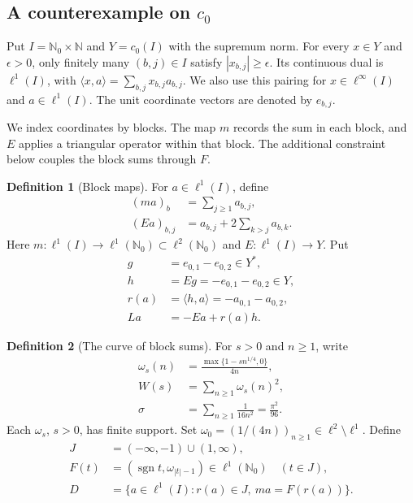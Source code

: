 \documentclass[11pt]{article}
\newcommand{\N}{\mathbb N}
\newcommand{\Nzero}{\mathbb N_0}
\newcommand{\sgn}{\operatorname{sgn}}
\newcommand{\pair}[2]{\langle #1,#2\rangle}
\theoremstyle{definition}
\newtheorem{definition}{Definition}
\theoremstyle{remark}
\begin{document}
\subsection{A counterexample on $c_0$}

Put $I=\Nzero\times\N$ and $Y=c_0(I)$ with the supremum norm. For every $x\in Y$ and $\epsilon>0$, only finitely many $(b,j)\in I$ satisfy $|x_{b,j}|\ge\epsilon$. Its continuous dual is $\ell^1(I)$, with $\pair{x}{a}=\sum_{b,j}x_{b,j}a_{b,j}$. We also use this pairing for $x\in\ell^\infty(I)$ and $a\in\ell^1(I)$. The unit coordinate vectors are denoted by $e_{b,j}$.

We index coordinates by blocks. The map $m$ records the sum in each block, and $E$ applies a triangular operator within that block. The additional constraint below couples the block sums through $F$.
\begin{definition}[Block maps]
For $a\in\ell^1(I)$, define
\begin{equation}
\begin{aligned}
(ma)_b&=\sum_{j\ge1}a_{b,j},\\
(Ea)_{b,j}&=a_{b,j}+2\sum_{k>j}a_{b,k}.
\end{aligned}
\label{eq:D4}
\end{equation}
Here $m:\ell^1(I)\to\ell^1(\Nzero)\subset\ell^2(\Nzero)$ and $E:\ell^1(I)\to Y$. Put
\begin{equation}
\begin{aligned}
g&=e_{0,1}-e_{0,2}\in Y^*,\\
h&=Eg=-e_{0,1}-e_{0,2}\in Y,\\
r(a)&=\pair{h}{a}=-a_{0,1}-a_{0,2},\\
La&=-Ea+r(a)h.
\end{aligned}
\label{eq:D5}
\end{equation}
\end{definition}

\begin{definition}[The curve of block sums]
For $s>0$ and $n\ge1$, write
\begin{equation}
\begin{aligned}
\omega_s(n)&=\frac{\max\{1-sn^{1/4},0\}}{4n},\\
W(s)&=\sum_{n\ge1}\omega_s(n)^2,\\
\sigma&=\sum_{n\ge1}\frac1{16n^2}=\frac{\pi^2}{96}.
\end{aligned}
\label{eq:D6}
\end{equation}
Each $\omega_s$, $s>0$, has finite support. Set $\omega_0=(1/(4n))_{n\ge1}\in\ell^2\setminus\ell^1$. Define
\begin{equation}
\begin{aligned}
J&=(-\infty,-1)\cup(1,\infty),\\
F(t)&=(\sgn t,\omega_{|t|-1})\in\ell^1(\Nzero)\quad(t\in J),\\
D&=\{a\in\ell^1(I):r(a)\in J,\ ma=F(r(a))\}.
\end{aligned}
\label{eq:D7}
\end{equation}

\end{definition}
\end{document}
